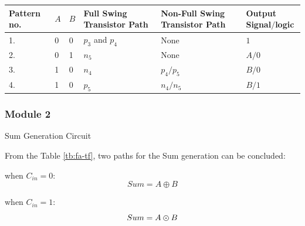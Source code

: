 \documentclass[conference]{IEEEtran}
\begin{document}
\begin{table}[!htb]
\begin{tabular}{p{1.5cm}p{1.5cm}p{1.5cm}p{4cm}p{4cm}l}
		Pattern no.                           & \(A\)                                                  & \(B\)                                  & Full Swing Transistor Path & Non-Full Swing Transistor Path & Output Signal\(/\)logic \\
		\hline
		1.                                    & 0                                                      & 0                                      & \(p_3\) and \(p_4\)        & None                           & \(1\)                   \\
		2.                                    & 0                                                      & 1                                      & \(n_5\)                    & None                           & \(A/0\)                 \\
		3.                                    & 1                                                      & 0                                      & \(n_4\)                    & \(p_4/p_5\)                    & \(B/0\)                 \\
		4.                                    & 1                                                      & 0                                      & \(p_5\)                    & \(n_4/n_5\)                    & \(B/1\)                 \\
		\hline
	\end{tabular}
	\label{tb:xor-xnor}
\end{table}

\subsubsection{Module 2}Sum Generation Circuit

From the Table \ref{tb:fa-tf}, two paths for the Sum generation can be concluded:

when \(C_{in} = 0\):
\[
	Sum = A \oplus B
\]

when \(C_{in} = 1\):
\[
	Sum = A \varodot B
\]
\end{document}
